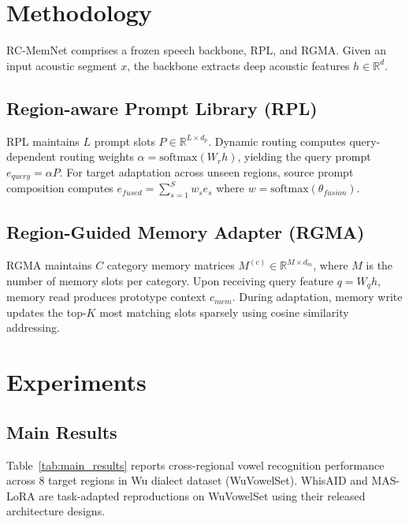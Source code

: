 \documentclass[letterpaper]{article}
\begin{document}
\section{Methodology}
RC-MemNet comprises a frozen speech backbone, RPL, and RGMA.
Given an input acoustic segment $x$, the backbone extracts deep acoustic features $h \in \mathbb{R}^d$.

\subsection{Region-aware Prompt Library (RPL)}
RPL maintains $L$ prompt slots $P \in \mathbb{R}^{L \times d_p}$. Dynamic routing computes query-dependent routing weights $\alpha = \text{softmax}(W_r h)$, yielding the query prompt $e_{query} = \alpha P$. For target adaptation across unseen regions, source prompt composition computes $e_{fused} = \sum_{s=1}^S w_s e_s$ where $w = \text{softmax}(\theta_{fusion})$.

\subsection{Region-Guided Memory Adapter (RGMA)}
RGMA maintains $C$ category memory matrices $M^{(c)} \in \mathbb{R}^{M \times d_m}$, where $M$ is the number of memory slots per category. Upon receiving query feature $q = W_q h$, memory read produces prototype context $c_{mem}$. During adaptation, memory write updates the top-$K$ most matching slots sparsely using cosine similarity addressing.

\section{Experiments}

\subsection{Main Results}
Table~\ref{tab:main_results} reports cross-regional vowel recognition performance across 8 target regions in Wu dialect dataset (WuVowelSet). WhisAID and MAS-LoRA are task-adapted reproductions on WuVowelSet using their released architecture designs.
\end{document}
